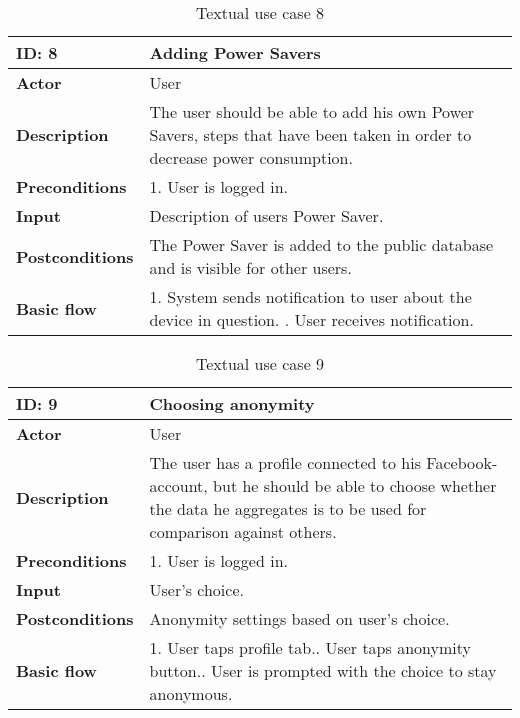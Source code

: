 \begin{table}[H]
\begin{tabular}{|l|p{11.7cm}|}
\hline
\textbf{ID: }8&\textbf{Adding Power Savers}
\\\hline
\textbf{Actor} &User
\\\hline
\textbf{Description}&
The user should be able to add his own Power Savers, steps that have been taken in order to decrease power consumption.\\\hline
\textbf{Preconditions}&
1. User is logged in.\\\hline
\textbf{Input}&
Description of users Power Saver.
\\\hline
\textbf{Postconditions}& 
The Power Saver is added to the public database and is visible for other users.
\\\hline
\textbf{Basic flow}&
1. System sends notification to user about the device in question. \newline
2. User receives notification.
\\\hline
\end{tabular}
\caption{Textual use case 8}
\end{table}


\begin{table}[H]
\begin{tabular}{|l|p{11.7cm}|}
\hline
\textbf{ID: }9&\textbf{Choosing anonymity}
\\\hline
\textbf{Actor} &User
\\\hline
\textbf{Description}&
The user has a profile connected to his Facebook-account, but he should be able to choose whether the data he aggregates is to be used for comparison against others.\\\hline
\textbf{Preconditions}&
1. User is logged in.\\\hline
\textbf{Input}&
User's choice.
\\\hline
\textbf{Postconditions}& 
Anonymity settings based on user's choice.
\\\hline
\textbf{Basic flow}&
1. User taps profile tab.\newline
2. User taps anonymity button.\newline
3. User is prompted with the choice to stay anonymous.
\\\hline
\end{tabular}
\caption{Textual use case 9}
\end{table}


